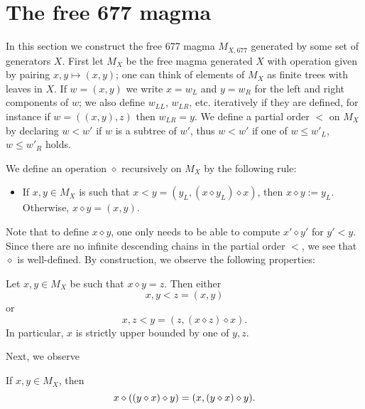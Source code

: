 \section{The free 677 magma}

In this section we construct the free 677 magma $M_{X,677}$ generated by some set of generators $X$.  First let $M_X$ be the free magma generated $X$ with operation given by pairing $x,y \mapsto (x,y)$; one can think of elements of $M_X$ as finite trees with leaves in $X$.  If $w = (x,y)$ we write $x = w_L$ and $y = w_R$ for the left and right components of $w$; we also define $w_{LL}$, $w_{LR}$, etc. iteratively if they are defined, for instance if $w = ((x,y),z)$ then $w_{LR} = y$.  We define a partial order $<$ on $M_X$ by declaring $w < w'$ if $w$ is a subtree of $w'$, thus $w < w'$ if one of $w \leq w'_L$, $w \leq w'_R$ holds.

We define an operation $\diamond$ recursively on $M_X$ by the following rule:
\begin{itemize}
\item If $x,y \in M_X$ is such that $x < y = (y_L, (x \diamond y_L) \diamond x)$, then $x \diamond y := y_L$.  Otherwise, $x \diamond y = (x,y)$.
\end{itemize}

Note that to define $x \diamond y$, one only needs to be able to compute $x' \diamond y'$ for $y' < y$.  Since there are no infinite descending chains in the partial order $<$, we see that $\diamond$ is well-defined.  By construction, we observe the following properties:

\begin{lemma}\label{op-prop}  Let $x,y \in M_X$ be such that $x \diamond y = z$.  Then either
$$ x, y < z = (x,y)$$
or
$$ x, z < y = (z, (x \diamond z) \diamond x).$$
In particular, $x$ is strictly upper bounded by one of $y,z$.
\end{lemma}

Next, we observe

\begin{lemma}\label{op-2}  If $x,y \in M_X$, then
  $$ x \diamond ((y \diamond x) \diamond y) = (x, (y \diamond x) \diamond y).$$
\end{lemma}

